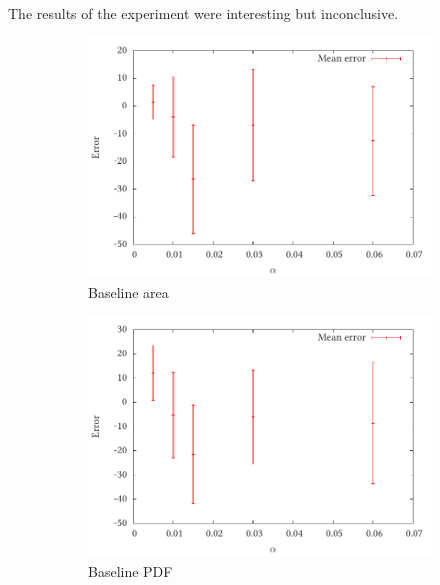 \documentclass[a4paper,11pt]{article}
\begin{document}
The results of the experiment were interesting but inconclusive.
\begin{center}
\begin{figure}
\label{fig:prelimerror}
\begin{subfigure}{0.5\textwidth}
\includegraphics[width=\textwidth]{base_area_prelim}
\caption{Baseline area}
\label{fig:}
\end{subfigure}
\begin{subfigure}{0.5\textwidth}
\includegraphics[width=\textwidth]{base_pmf_prelim}
\caption{Baseline PDF}
\label{fig:}
\end{subfigure}\\
\begin{subfigure}{0.5\textwidth}

\end{subfigure}
\end{figure}
\end{center}
\end{document}
